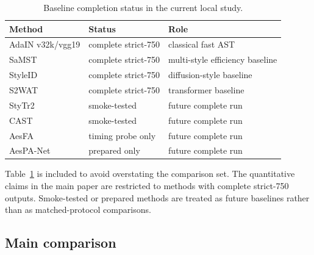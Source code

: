 ﻿\documentclass{article}
\begin{document}
\begin{table}[t]
\centering
\caption{Baseline completion status in the current local study.}
\label{tab:baseline_status}
\begin{tabular}{lll}
\toprule
Method & Status & Role \\
\midrule
AdaIN v32k/vgg19 & complete strict-750 & classical fast AST \\
SaMST & complete strict-750 & multi-style efficiency baseline \\
StyleID & complete strict-750 & diffusion-style baseline \\
S2WAT & complete strict-750 & transformer baseline \\
StyTr2 & smoke-tested & future complete run \\
CAST & smoke-tested & future complete run \\
AesFA & timing probe only & future complete run \\
AesPA-Net & prepared only & future complete run \\
\bottomrule
\end{tabular}
\end{table}

Table~\ref{tab:baseline_status} is included to avoid overstating the comparison set. The quantitative claims in the main paper are restricted to methods with complete strict-750 outputs. Smoke-tested or prepared methods are treated as future baselines rather than as matched-protocol comparisons.

\subsection{Main comparison}
\begin{table}[t]
\centering
\caption{Strict-750 comparison. Higher is better for CLIP-S, CLIP-C, EC, MUSIQ, and MANIQA. Lower is better for LPIPS, DISTS, HF-KID, and KID.}
\label{tab:main}
\end{table}
\end{document}
